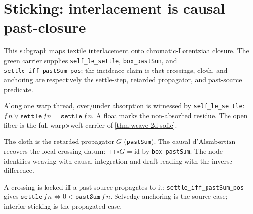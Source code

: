 \section{Sticking: interlacement is causal past-closure}

This subgraph maps textile interlacement onto chromatic-Lorentzian closure.  The
green carrier supplies \texttt{self\_le\_settle},
\texttt{box\_pastSum}, and \texttt{settle\_iff\_pastSum\_pos}; the incidence
claim is that crossings, cloth, and anchoring are respectively the settle-step,
retarded propagator, and past-source predicate.

\begin{theorem}\label{thm:interlacement-is-settle}\leanok{}
Along one warp thread, over/under absorption is witnessed by
\texttt{self\_le\_settle}: $f\,n \lor \texttt{settle}\,f\,n =
\texttt{settle}\,f\,n$.  A float marks the non-absorbed residue.  The open fiber is
the full warp$\times$weft carrier of \cref{thm:weave-2d-sofic}.
\end{theorem}

\begin{theorem}\label{thm:fabric-is-propagator}\leanok{}
The cloth is the retarded propagator $G$ (\texttt{pastSum}).  The causal
d'Alembertian recovers the local crossing datum:
$\Box\circ G=\mathrm{id}$ by \texttt{box\_pastSum}.  The node identifies weaving
with causal integration and draft-reading with the inverse difference.
\end{theorem}

\begin{theorem}\label{thm:stick-iff-past-source}\leanok{}
A crossing is locked iff a past source propagates to it:
\texttt{settle\_iff\_pastSum\_pos} gives
$\texttt{settle}\,f\,n \iff 0<\texttt{pastSum}\,f\,n$.  Selvedge anchoring is the
source case; interior sticking is the propagated case.
\end{theorem}
